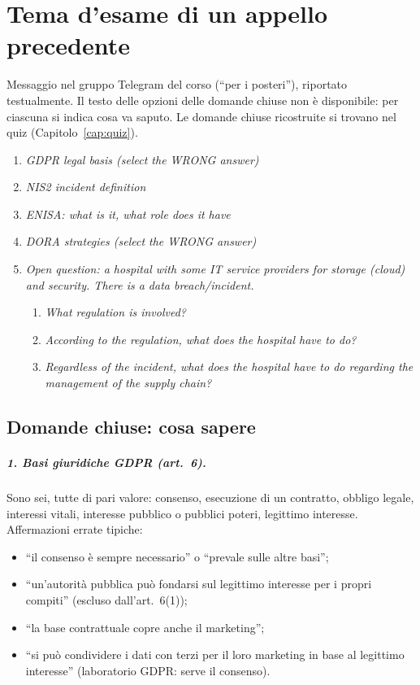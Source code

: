 \chapter{Tema d'esame di un appello precedente}
\label{cap:tema-precedente}

\begin{nota}[Fonte]
Messaggio nel gruppo Telegram del corso (``per i posteri''), riportato testualmente. Il testo delle
opzioni delle domande chiuse non è disponibile: per ciascuna si indica cosa va saputo. Le domande
chiuse ricostruite si trovano nel quiz (Capitolo~\ref{cap:quiz}).
\end{nota}

\begin{enumerate}
  \item \emph{GDPR legal basis (select the WRONG answer)}
  \item \emph{NIS2 incident definition}
  \item \emph{ENISA: what is it, what role does it have}
  \item \emph{DORA strategies (select the WRONG answer)}
  \item \emph{Open question: a hospital with some IT service providers for storage (cloud) and security.
    There is a data breach/incident.}
    \begin{enumerate}[label=\Alph*)]
      \item \emph{What regulation is involved?}
      \item \emph{According to the regulation, what does the hospital have to do?}
      \item \emph{Regardless of the incident, what does the hospital have to do regarding the
        management of the supply chain?}
    \end{enumerate}
\end{enumerate}

\section{Domande chiuse: cosa sapere}

\paragraph{1. Basi giuridiche GDPR (art.~6).} Sono sei, tutte di pari valore: consenso, esecuzione di
un contratto, obbligo legale, interessi vitali, interesse pubblico o pubblici poteri, legittimo
interesse. Affermazioni errate tipiche:
\begin{itemize}
  \item ``il consenso è sempre necessario'' o ``prevale sulle altre basi'';
  \item ``un'autorità pubblica può fondarsi sul legittimo interesse per i propri compiti'' (escluso
    dall'art.~6(1));
  \item ``la base contrattuale copre anche il marketing'';
  \item ``si può condividere i dati con terzi per il loro marketing in base al legittimo interesse''
    (laboratorio GDPR: serve il consenso).
\end{itemize}

